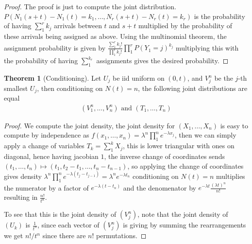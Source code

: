 \documentclass{article}
\theoremstyle{definition}
\newtheorem{theorem}{Theorem}
\newcommand{\tand}{\text{ and }}
\begin{document}
    \begin{proof}
        The proof is just to compute the joint distribution. \(P(N_1(s+t) - N_1(t) = k_1,\hdots,N_r(s+t) - N_r(t) = k_r)\) is the probability of having \(\sum_1^r k_j\) arrivals between \(t\) and \(s+t\) multiplied by the probability of these arrivals being assigned as above. Using the multinomial theorem, the assignment probability is given by \(\frac{\sum_1^r k_j!}{\prod_1^r k_j!}\prod_1^r P(Y_1 = j)^{k_j}\) multiplying this with the probability of having \(\sum_1^{k_r}\) assignments gives the desired probability.
    \end{proof}
    \begin{theorem}[Conditioning]
        Let \(U_j\) be iid uniform on \((0,t)\), and \(V^n_j\) be the \(j\)-th smallest \(U_j\), then conditioning on \(N(t) = n\), the following joint distributions are equal
        \begin{align*}
            (V_1^n,\hdots,V_n^n) \tand (T_1,\hdots,T_n)
        \end{align*}
    \end{theorem}
    \begin{proof}
        We compute the joint density, the joint density for \((X_1,\hdots,X_n)\) is easy to compute by independence as \(f(x_1,\hdots,x_n) = \lambda^n \prod_1^n e^{-\lambda x_j}\), then we can simply apply a change of variables \(T_k = \sum_1^k X_j\), this is lower triangular with ones on diagonal, hence having jacobian \(1\), the inverse change of coordinates sends \((t_1,\hdots,t_n) \mapsto (t_1,t_2-t_1,\hdots,t_n-t_{n-1})\), so applying the change of coordinates gives density \(\lambda^n \prod_1^n e^{-\lambda (t_j - t_{j-1})} = \lambda^n e^{-\lambda t_n}\) conditioning on \(N(t) = n\) multiplies the numerator by a factor of \(e^{- \lambda(t - t_n)}\) and the denomenator by \(e^{-\lambda t}\frac{(\lambda t)^n}{n!}\) resulting in \(\frac{n!}{t^n}\).

        To see that this is the joint density of \((V_j^n)\), note that the joint density of \((U_k)\) is \(\frac{1}{t^n}\), since each vector of \((V_j^n)\) is giving by summing the rearrangements we get \(n!/t^n\) since there are \(n!\) permutations.
    \end{proof}
\end{document}
